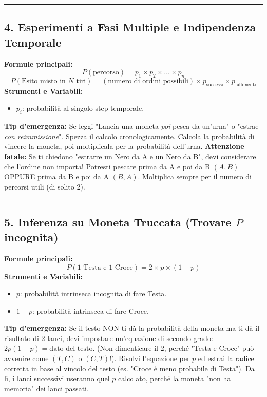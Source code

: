 \documentclass[12pt, a4paper]{article}
\begin{document}
\vspace{0.3cm}\hrule\vspace{0.3cm}

\subsection*{4. Esperimenti a Fasi Multiple e Indipendenza Temporale}
\textbf{Formule principali:}
$$ P(\text{percorso}) = p_1 \times p_2 \times \dots \times p_n $$
$$ P(\text{Esito misto in } N \text{ tiri}) = (\text{numero di ordini possibili}) \times p_{\text{successi}} \times p_{\text{fallimenti}} $$
\textbf{Strumenti e Variabili:}
\begin{itemize}
    \item $p_i$: probabilità al singolo step temporale.
\end{itemize}
\textbf{Tip d'emergenza:} Se leggi "Lancia una moneta \textit{poi} pesca da un'urna" o "estrae \textit{con reimmissione}". Spezza il calcolo cronologicamente. Calcola la probabilità di vincere la moneta, poi moltiplicala per la probabilità dell'urna. 
\textbf{Attenzione fatale:} Se ti chiedono "estrarre un Nero da A e un Nero da B", devi considerare che l'ordine non importa! Potresti pescare prima da A e poi da B $(A,B)$ OPPURE prima da B e poi da A $(B,A)$. Moltiplica sempre per il numero di percorsi utili (di solito $2$).

\vspace{0.3cm}\hrule\vspace{0.3cm}

\subsection*{5. Inferenza su Moneta Truccata (Trovare $P$ incognita)}
\textbf{Formule principali:}
$$ P(1 \text{ Testa e } 1 \text{ Croce}) = 2 \times p \times (1-p) $$
\textbf{Strumenti e Variabili:}
\begin{itemize}
    \item $p$: probabilità intrinseca incognita di fare Testa.
    \item $1-p$: probabilità intrinseca di fare Croce.
\end{itemize}
\textbf{Tip d'emergenza:} Se il testo NON ti dà la probabilità della moneta ma ti dà il risultato di 2 lanci, devi impostare un'equazione di secondo grado: $2p(1-p) = \text{dato del testo}$. (Non dimenticare il $2$, perché "Testa e Croce" può avvenire come $(T,C)$ o $(C,T)$!). Risolvi l'equazione per $p$ ed estrai la radice corretta in base al vincolo del testo (es. "Croce è meno probabile di Testa"). Da lì, i lanci successivi useranno quel $p$ calcolato, perché la moneta "non ha memoria" dei lanci passati.
\end{document}
